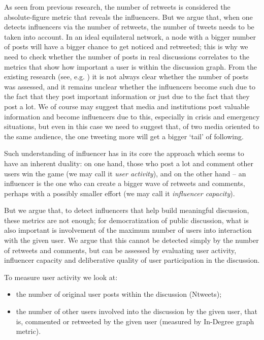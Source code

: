 As seen from previous research, the number of retweets is considered the absolute-figure metric that reveals the influencers. But we argue that, when one detects influencers via the number of retweets, the number of tweets needs to be taken into account. In an ideal equilateral network, a node with a bigger number of posts will have a bigger chance to get noticed and retweeted; this is why we need to check whether the number of posts in real discussions correlates to the metrics that show how important a user is within the discussion graph. From the existing research (see, e.g. \cite{Vis,Bruns}) it is not always clear whether the number of posts was assessed, and it remains unclear whether the influencers become such due to the fact that they post important information or just due to the fact that they post a lot. We of course may suggest that media and institutions post valuable information and become influencers due to this, especially in crisis and emergency situations, but even in this case we need to suggest that, of two media oriented to the same audience, the one tweeting more will get a bigger ‘tail’ of following.

Such understanding of influencer has in its core the approach which seems to have an inherent duality: on one hand, those who post a lot and comment other users win the game (we may call it \textit{user activity}), and on the other hand -- an influencer is the one who can create a bigger wave of retweets and comments, perhaps with a possibly smaller effort (we may call it \textit{influencer capacity}).

But we argue that, to detect influencers that help build meaningful discussion, these metrics are not enough; for democratization of public discussion, what is also important is involvement of the maximum number of users into interaction with the given user. We argue that this cannot be detected simply by the number of retweets and comments, but can be assessed by evaluating user activity, influencer capacity and deliberative quality of user participation in the discussion.

To measure user activity we look at:
\begin{itemize}
	\item the number of original user posts within the discussion (Ntweets);
	\item the number of other users involved into the discussion by the given user, that is, commented or retweeted by the given user (measured by In-Degree graph metric).
\end{itemize}

